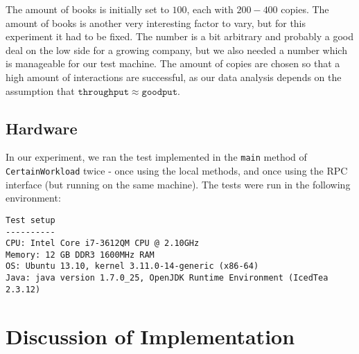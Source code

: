 \documentclass[11pt,a4paper]{article}
\begin{document}
The amount of books is initially set to $100$, each with $200-400$ copies.
The amount of books is another very interesting factor to vary, but for this
experiment it had to be fixed. The number is a bit arbitrary and probably a
good deal on the low side for a growing company, but we also needed a number
which is manageable for our test machine. The amount of copies are chosen so
that a high amount of interactions are successful, as our data analysis depends
on the assumption that $\mathtt{throughput} \approx \mathtt{goodput}$.

\subsection*{Hardware}
In our experiment, we ran the test implemented in the \texttt{main} method of
\texttt{CertainWorkload} twice - once using the local methods, and once using
the RPC interface (but running on the same machine). The tests were run in the
following environment:

\begin{verbatim}
Test setup
----------
CPU: Intel Core i7-3612QM CPU @ 2.10GHz
Memory: 12 GB DDR3 1600MHz RAM
OS: Ubuntu 13.10, kernel 3.11.0-14-generic (x86-64) 
Java: java version 1.7.0_25, OpenJDK Runtime Environment (IcedTea 2.3.12)
\end{verbatim}
\subsection{}

\section{Discussion of Implementation}
\end{document}
